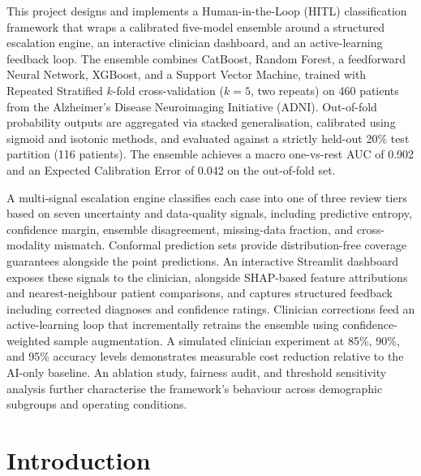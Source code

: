 \documentclass[12pt, a4paper]{report}
\begin{document}
  This project designs and implements a Human-in-the-Loop (HITL) classification
  framework that wraps a calibrated five-model ensemble around a structured
  escalation engine, an interactive clinician dashboard, and an active-learning
  feedback loop. The ensemble combines CatBoost, Random Forest, a feedforward
  Neural Network, XGBoost, and a Support Vector Machine, trained with
  Repeated Stratified $k$-fold cross-validation ($k=5$, two repeats) on 460 patients
  from the Alzheimer's Disease Neuroimaging Initiative (ADNI). Out-of-fold
  probability outputs are aggregated via stacked generalisation, calibrated using
  sigmoid and isotonic methods, and evaluated against a strictly held-out 20\%
  test partition (116 patients). The ensemble achieves a macro one-vs-rest AUC of
  0.902 and an Expected Calibration Error of 0.042 on the out-of-fold set.

  A multi-signal escalation engine classifies each case into one of three review
  tiers based on seven uncertainty and data-quality signals, including predictive
  entropy, confidence margin, ensemble disagreement, missing-data fraction, and
  cross-modality mismatch. Conformal prediction sets provide distribution-free
  coverage guarantees alongside the point predictions. An interactive Streamlit
  dashboard exposes these signals to the clinician, alongside SHAP-based feature
  attributions and nearest-neighbour patient comparisons, and captures structured
  feedback including corrected diagnoses and confidence ratings. Clinician corrections
  feed an active-learning loop that incrementally retrains the ensemble using
  confidence-weighted sample augmentation. A simulated clinician experiment at
  85\%, 90\%, and 95\% accuracy levels demonstrates measurable cost reduction
  relative to the AI-only baseline. An ablation study, fairness audit, and
  threshold sensitivity analysis further characterise the framework's behaviour
  across demographic subgroups and operating conditions.


  \tableofcontents
  \listoffigures
  \listoftables


  \chapter{Introduction}
  \label{chap:introduction}
\end{document}
